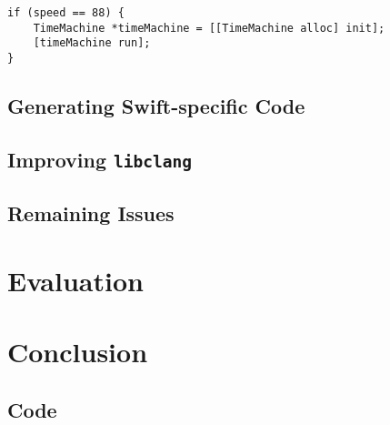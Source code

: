 \documentclass{sfuthesis}
\begin{document}
\begin{lstlisting}[frame=single]
if (speed == 88) {
    TimeMachine *timeMachine = [[TimeMachine alloc] init];
    [timeMachine run];
}
\end{lstlisting}


\section{Generating Swift-specific Code}

\section{Improving \texttt{libclang}}


\section{Remaining Issues}


\chapter{Evaluation}

\chapter{Conclusion}



%
%
%
%
%

\backmatter%
	
	

\begin{appendices} %
	\chapter{Code}
\end{appendices}
\end{document}
